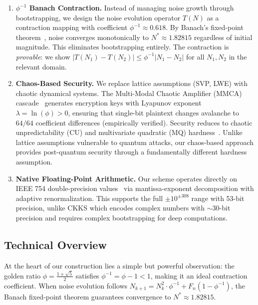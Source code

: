 \documentclass[11pt,a4paper]{article}
\begin{document}
\begin{enumerate}[leftmargin=*,itemsep=3pt,topsep=3pt]
    \item \textbf{$\phi^{-1}$ Banach Contraction.} Instead of managing noise growth through bootstrapping, we design the noise evolution operator $T(N)$ as a contraction mapping with coefficient $\phi^{-1} \approx 0.618$. By Banach's fixed-point theorem~\cite{banach1922}, noise converges monotonically to $N^* \approx 1.82815$ regardless of initial magnitude. This eliminates bootstrapping entirely. The contraction is \emph{provable}: we show $|T(N_1)-T(N_2)| \leq \phi^{-1}|N_1-N_2|$ for all $N_1, N_2$ in the relevant domain.
    
    \item \textbf{Chaos-Based Security.} We replace lattice assumptions (SVP, LWE) with chaotic dynamical systems. The Multi-Modal Chaotic Amplifier (MMCA) cascade~\cite{strogatz2018} generates encryption keys with Lyapunov exponent $\lambda = \ln(\phi) > 0$, ensuring that single-bit plaintext changes avalanche to $64/64$ coefficient differences (empirically verified). Security reduces to chaotic unpredictability (CU) and multivariate quadratic (MQ) hardness~\cite{patarin1996}. Unlike lattice assumptions vulnerable to quantum attacks, our chaos-based approach provides post-quantum security through a fundamentally different hardness assumption.
    
    \item \textbf{Native Floating-Point Arithmetic.} Our scheme operates directly on IEEE 754 double-precision values~\cite{ieee754} via mantissa-exponent decomposition with adaptive renormalization. This supports the full $\pm 10^{\pm 308}$ range with 53-bit precision, unlike CKKS which encodes complex numbers with $\sim$30-bit precision and requires complex bootstrapping for deep computations.
\end{enumerate}

\subsection{Technical Overview}

At the heart of our construction lies a simple but powerful observation: the golden ratio $\phi = \frac{1+\sqrt{5}}{2}$ satisfies $\phi^{-1} = \phi - 1 < 1$, making it an ideal contraction coefficient. When noise evolution follows $N_{k+1} = N_k^2 \cdot \phi^{-1} + F_n(1-\phi^{-1})$, the Banach fixed-point theorem guarantees convergence to $N^* \approx 1.82815$.
\end{document}
